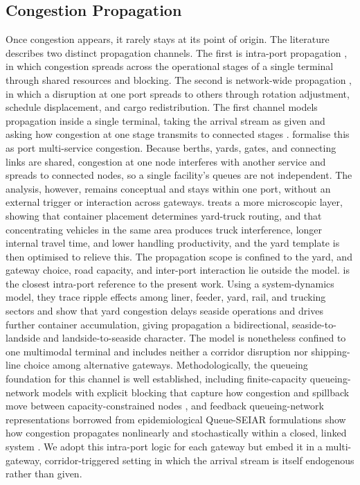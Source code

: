\documentclass[a4paper,fleqn]{cas-sc}
\begin{document}
\subsection{Congestion Propagation}
Once congestion appears, it rarely stays at its point of origin. The literature describes two distinct propagation channels. The first is intra-port propagation \citep{TalleyNg2016,OsorioBierlaire2009}, in which congestion spreads across the operational stages of a single terminal through shared resources and blocking. The second is network-wide propagation \citep{BellEtAl2023,CaoEtAl2025}, in which a disruption at one port spreads to others through rotation adjustment, schedule displacement, and cargo redistribution. The first channel models propagation inside a single terminal, taking the arrival stream as given and asking how congestion at one stage transmits to connected stages \citep{TalleyNg2016,TalleyNg2024}. \citet{TalleyNg2016} formalise this as port multi-service congestion. Because berths, yards, gates, and connecting links are shared, congestion at one node interferes with another service and spreads to connected nodes, so a single facility's queues are not independent. The analysis, however, remains conceptual and stays within one port, without an external trigger or interaction across gateways. \citet{Zhen2016} treats a more microscopic layer, showing that container placement determines yard-truck routing, and that concentrating vehicles in the same area produces truck interference, longer internal travel time, and lower handling productivity, and the yard template is then optimised to relieve this. The propagation scope is confined to the yard, and gateway choice, road capacity, and inter-port interaction lie outside the model. \citet{ZhangEtAl2025} is the closest intra-port reference to the present work. Using a system-dynamics model, they trace ripple effects among liner, feeder, yard, rail, and trucking sectors and show that yard congestion delays seaside operations and drives further container accumulation, giving propagation a bidirectional, seaside-to-landside and landside-to-seaside character. The model is nonetheless confined to one multimodal terminal and includes neither a corridor disruption nor shipping-line choice among alternative gateways. Methodologically, the queueing foundation for this channel is well established, including finite-capacity queueing-network models with explicit blocking that capture how congestion and spillback move between capacity-constrained nodes \citep{OsorioBierlaire2009}, and feedback queueing-network representations borrowed from epidemiological Queue-SEIAR formulations show how congestion propagates nonlinearly and stochastically within a closed, linked system \citep{WuEtAl}. We adopt this intra-port logic for each gateway but embed it in a multi-gateway, corridor-triggered setting in which the arrival stream is itself endogenous rather than given.
\end{document}

